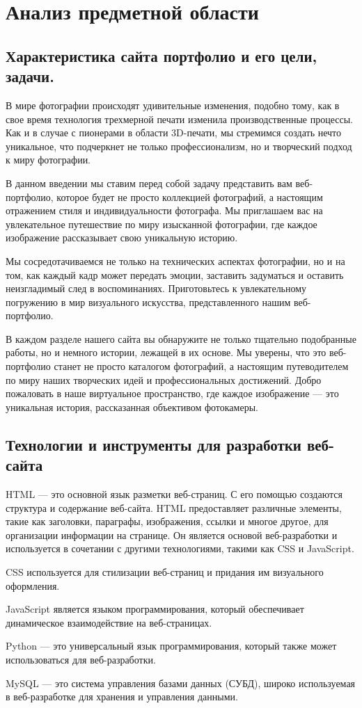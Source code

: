 \section{Анализ предметной области}
\subsection{Характеристика сайта портфолио и его цели, задачи.}

В мире фотографии происходят удивительные изменения, подобно тому, как в свое время технология трехмерной печати изменила производственные процессы. Как и в случае с пионерами в области 3D-печати, мы стремимся создать нечто уникальное, что подчеркнет не только профессионализм, но и творческий подход к миру фотографии.

В данном введении мы ставим перед собой задачу представить вам веб-портфолио, которое будет не просто коллекцией фотографий, а настоящим отражением стиля и индивидуальности фотографа. Мы приглашаем вас на увлекательное путешествие по миру изысканной фотографии, где каждое изображение рассказывает свою уникальную историю.

Мы сосредотачиваемся не только на технических аспектах фотографии, но и на том, как каждый кадр может передать эмоции, заставить задуматься и оставить неизгладимый след в воспоминаниях. Приготовьтесь к увлекательному погружению в мир визуального искусства, представленного нашим веб-портфолио.

В каждом разделе нашего сайта вы обнаружите не только тщательно подобранные работы, но и немного истории, лежащей в их основе. Мы уверены, что это веб-портфолио станет не просто каталогом фотографий, а настоящим путеводителем по миру наших творческих идей и профессиональных достижений. Добро пожаловать в наше виртуальное пространство, где каждое изображение — это уникальная история, рассказанная объективом фотокамеры.
\subsection{Технологии и инструменты для разработки веб-сайта}

HTML — это основной язык разметки веб-страниц. С его помощью создаются структура и содержание веб-сайта. HTML предоставляет различные элементы, такие как заголовки, параграфы, изображения, ссылки и многое другое, для организации информации на странице. Он является основой веб-разработки и используется в сочетании с другими технологиями, такими как CSS и JavaScript.

CSS используется для стилизации веб-страниц и придания им визуального оформления.

JavaScript является языком программирования, который обеспечивает динамическое взаимодействие на веб-страницах. 

Python — это универсальный язык программирования, который также может использоваться для веб-разработки.

MySQL — это система управления базами данных (СУБД), широко используемая в веб-разработке для хранения и управления данными.